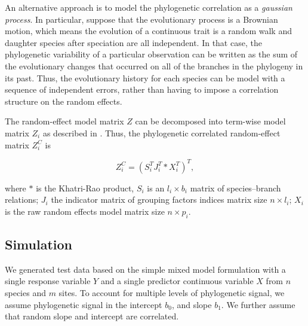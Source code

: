 An alternative approach is to model the phylogenetic correlation as a \textit{gaussian process}. 
In particular, suppose that the evolutionary process is a Brownian motion, which means the evolution of a continuous trait is a random walk and daughter species after speciation are all independent.  
In that case, the phylogenetic variability of a particular observation can be written as the sum of the evolutionary changes that occurred on all of the branches in the phylogeny in its past. 
Thus, the evolutionary history for each species can be model with a sequence of independent errors, rather than having to impose a correlation structure on the random effects. 

The random-effect model matrix $Z$ can be decomposed into term-wise model matrix $Z_{i}$ as described in .
Thus, the phylogenetic correlated random-effect matrix $Z^{C}_{i}$ is

\begin{equation}
Z^{C}_{i} = (S^{T}_{i}J^{T}_{i} \ast X^{T}_{i})^{T},
\end{equation}


where $\ast$ is the Khatri-Rao product, $S_{i}$ is an $l_{i} \times b_{i}$ matrix of species--branch relations; $J_{i}$ the indicator matrix of grouping factors indices matrix size $n \times l_{i}$; $X_{i}$ is the raw random effects model matrix size $n \times p_{i}$.



\subsection{Simulation}

We generated test data based on the simple mixed model formulation  with a single response variable $Y$ and a single predictor continuous variable $X$ from $n$ species and $m$ sites. 
To account for multiple levels of phylogenetic signal, we assume phylogenetic signal in the intercept $b_0$, and slope $b_1$.
We further assume that random slope and intercept are correlated. 


